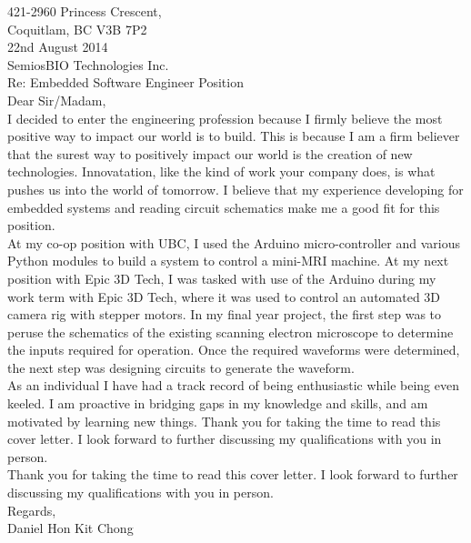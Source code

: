 \documentclass[10pt,a4paper]{article}
\begin{document}
\flushleft
\large
421-2960 Princess Crescent,\\
Coquitlam, BC V3B 7P2 \\
\medskip
22nd August 2014 \\
\medskip
SemiosBIO Technologies Inc.\\
\medskip
Re: Embedded Software Engineer Position\\
\medskip
Dear Sir/Madam,\\

\medskip
\hspace{10mm}
I decided to enter the engineering profession because I firmly believe the most positive way to impact our world is to build.
This is because I am a firm believer that the surest way to positively impact our world is the creation of new technologies.
Innovatation, like the kind of work your company does, is what pushes us into the world of tomorrow.
I believe that my experience developing for embedded systems and reading circuit schematics make me a good fit for this position.
\\
\medskip
\hspace{10mm}
At my co-op position with UBC, I used the Arduino micro-controller and various Python modules to build a system to control a mini-MRI machine.
At my next position with Epic 3D Tech, I was tasked with use of the Arduino during my work term with Epic 3D Tech, where it was used to control an automated 3D camera rig with stepper motors.
In my final year project, the first step was to peruse the schematics of the existing scanning electron microscope to determine the 
inputs required for operation.
Once the required waveforms were determined, the next step was designing circuits to generate the waveform.
\\
\medskip
\hspace{10mm}
As an individual I have had a track record of being enthusiastic while being even keeled. 
I am proactive in bridging gaps in my knowledge and skills, and am motivated by learning new things.
Thank you for taking the time to read this cover letter.
I look forward to further discussing my qualifications with you in person.
\\
\medskip
\hspace{10mm}
Thank you for taking the time to read this cover letter.
I look forward to further discussing my qualifications with you in person.\\


\bigskip
Regards, \\
Daniel Hon Kit Chong
\end{document}
